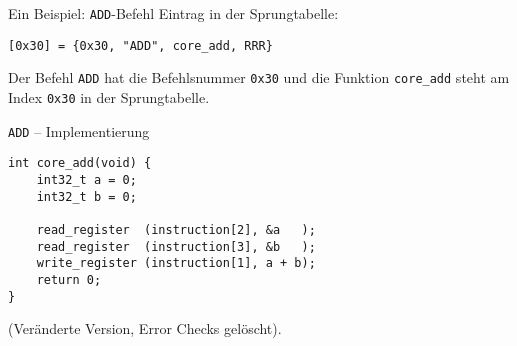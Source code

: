 \begin{frame}[fragile]{Ein Beispiel: \texttt{ADD}-Befehl}
Eintrag in der Sprungtabelle:
\begin{lstlisting}
[0x30] = {0x30, "ADD", core_add, RRR}
\end{lstlisting}

Der Befehl \texttt{ADD} hat die Befehlsnummer \texttt{0x30} und die Funktion
\texttt{core\_add} steht am Index \texttt{0x30} in der Sprungtabelle.
\end{frame}


\begin{frame}[fragile]{\texttt{ADD} -- Implementierung}
\begin{lstlisting}
int core_add(void) {
    int32_t a = 0; 
    int32_t b = 0;

    read_register  (instruction[2], &a   );
    read_register  (instruction[3], &b   );
    write_register (instruction[1], a + b);       
    return 0;
}
\end{lstlisting}
(Veränderte Version, Error Checks gelöscht).
\end{frame}



